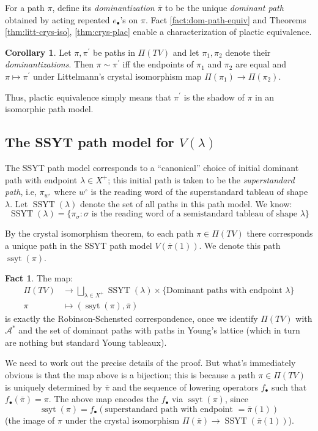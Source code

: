 \documentclass[reqno]{amsart}
\theoremstyle{definition}
\newtheorem{fact}{Fact}
\newtheorem{corollary}{Corollary}
\newcommand{\dom}[1]{\overline{#1}}
\DeclareMathOperator{\SSYT}{SSYT}
\DeclareMathOperator{\ssyt}{ssyt}
\begin{document}
For a path $\pi$, define its {\em dominantization} $\overline{\pi}$ to be the unique {\em dominant path} obtained by acting repeated $e_\bullet$'s on $\pi$.
Fact \ref{fact:dom-path-equiv} and Theorems \ref{thm:litt-crys-iso}, \ref{thm:crys-plac} enable a characterization of plactic equivalence.

\begin{corollary}
Let $\pi, \pi^\prime$ be paths in $\Pi(TV)$ and let $\pi_1, \pi_2$ denote their {\em dominantizations}. Then $\pi \sim \pi^\prime$ iff the endpoints of $\pi_1$ and $\pi_2$ are equal and $\pi \mapsto \pi^\prime$ under Littelmann's crystal isomorphism map $\Pi(\pi_1) \to \Pi(\pi_2)$.
\end{corollary}

Thus, plactic equivalence simply means that $\pi^\prime$ is the shadow of $\pi$ in an isomorphic path model.


\subsection{The SSYT path model for $V(\lambda)$}
The SSYT path model corresponds to a ``canonical'' choice of initial dominant path with endpoint $\lambda \in X^+$; this initial path is taken to be the {\em superstandard path}, i.e, $\pi_{w^\circ}$ where $w^\circ$ is the reading word of the superstandard tableau of shape $\lambda$. Let $\SSYT(\lambda)$ denote the set of all paths in this path model. We know: \[\SSYT(\lambda) = \{\pi_\sigma: \sigma \text{ is the reading word of a  semistandard tableau of shape } \lambda\} \]

By the crystal isomorphism theorem, to each path $\pi \in \Pi(TV)$ there corresponds a unique path in the SSYT path model $V(\dom{\pi}(1))$. We denote this path $\ssyt(\pi)$.
\begin{fact}\label{fact:rs-corresp-paths}
The map: 
\begin{align}
  \Pi(TV) &\to \bigsqcup_{\lambda \in X^+} \SSYT(\lambda) \times \{\text{Dominant paths with endpoint } \lambda \}\\
  \pi &\mapsto (\ssyt(\pi), \dom{\pi})
\end{align}
is exactly the Robinson-Schensted correspondence, once we identify $\Pi(TV)$ with $\mathcal{A}^*$ and the set of dominant paths with paths in Young's lattice (which in turn are nothing but standard Young tableaux).
\end{fact}
We need to work out the precise details of the proof. But what's immediately obvious is that the map above is a bijection; this is because a path $\pi \in \Pi(TV)$ is uniquely determined by $\dom{\pi}$ and the sequence of lowering operators $f_\bullet$ such that $f_\bullet(\dom{\pi})=\pi$. The above map encodes the $f_\bullet$ via $\ssyt(\pi)$, since \[\ssyt(\pi) = f_\bullet(\text{superstandard path with endpoint } =\dom{\pi}(1))\]
(the image of $\pi$ under the crystal isomorphism $\Pi(\dom{\pi}) \to \SSYT(\dom{\pi}(1))$).
\end{document}
